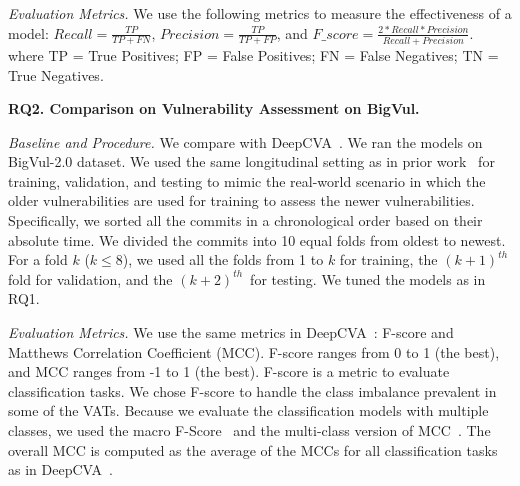\emph{Evaluation Metrics.} We use the following metrics to measure the
effectiveness of a model: $Recall = \frac{TP}{TP+FN}$, $Precision =
\frac{TP}{TP+FP}$, and $F\_score =
\frac{2*Recall*Precision}{Recall+Precision}$.
where TP = True Positives; FP = False Positives; FN = False Negatives; TN = True Negatives.


\noindent\textbf{RQ2. Comparison on Vulnerability Assessment on BigVul.}

{\em Baseline and Procedure.} We compare {\tool} with
DeepCVA~\cite{deepCVA-ase21}. We ran the models on BigVul-2.0
dataset. We used the same longitudinal setting as in prior
work~\cite{deepCVA-ase21,falessi2020need} for training, validation,
and testing to mimic the real-world scenario in which the older
vulnerabilities are used for training to assess the newer
vulnerabilities. Specifically, we sorted all the commits in a
chronological order based on their absolute time. We divided the
commits into 10 equal folds from oldest to newest. For a fold $k$ ($k
\le 8$), we used all the folds from 1 to $k$ for training, the
$(k+1)^{th}$ fold for validation, and the $(k+2)^{th}$~for testing. We
tuned the models as in RQ1.



\emph{Evaluation Metrics.} We use the same metrics in
DeepCVA~\cite{deepCVA-ase21}: F-score and Matthews Correlation
Coefficient (MCC). F-score ranges from 0 to 1 (the best), and MCC
ranges from -1 to 1 (the best). F-score is a metric to evaluate
classification tasks. We chose F-score to handle the class imbalance
prevalent in some of the VATs. Because we evaluate the classification
models with multiple classes, we used the macro
F-Score~\cite{spanos2018multi} and the multi-class version of
MCC~\cite{gorodkin04}. The overall MCC is computed as the average of
the MCCs for all classification tasks as in DeepCVA~\cite{deepCVA-ase21}.

